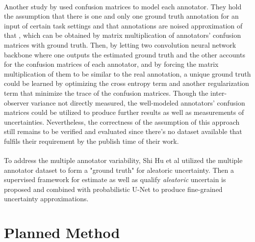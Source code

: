 \documentclass[12pt]{extarticle}
\begin{document}
\paragraph{}
Another study by \cite{zhang2020disentangling} used confusion matrices to
model each annotator. They hold the assumption that there is one and
only one ground truth annotation for an input of certain task settings and
that annotations are noised approximation of that
, which can be obtained by matrix multiplication of annotators' 
confusion matrices with ground truth. Then, by letting two convolution neural network backbone
where one outputs the estimated ground truth and the other accounts for the confusion matrices
of each annotator, and by forcing the matrix multiplication of them to be similar to the
real annotation, a unique ground truth could be learned by optimizing the cross entropy term
and another regularization term that minimize the trace of the confusion matrices.
Though the inter-observer variance not directly measured, the well-modeled annotators'
confusion matrices could be utilized to produce further results
as well as measurements of uncertainties.
Nevertheless, the correctness of the assumption of this approach
still remains to be verified and evaluated since there's no dataset available 
that fulfils their requirement by the publish time of their work.
\paragraph{}
To address the multiple annotator variability, Shi Hu et al utilized the multiple annotator dataset
to form a "ground truth" for aleatoric uncertainty. Then a supervised framework for estimate
as well as qualify \textit{aleatoric} uncertain is proposed and combined with probabilistic U-Net
to produce fine-grained uncertainty approximations\cite{hu2019supervised}. 

\section{Planned Method}
\end{document}
